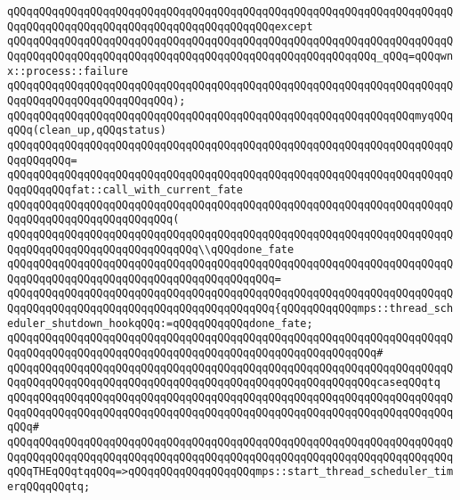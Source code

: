 \verb|qQQqqQQqqQQqqQQqqQQqqQQqqQQqqQQqqQQqqQQqqQQqqQQqqQQqqQQqqQQqqQQqqQQqqQQqqQQqqQQqqQQqqQQqqQQqqQQqqQQqqQQqqQQqqQQqexcept|\newline
\verb|qQQqqQQqqQQqqQQqqQQqqQQqqQQqqQQqqQQqqQQqqQQqqQQqqQQqqQQqqQQqqQQqqQQqqQQqqQQqqQQqqQQqqQQqqQQqqQQqqQQqqQQqqQQqqQQqqQQqqQQqqQQqqQQq_qQQq=qQQqwnx::process::failure|\newline
\verb|qQQqqQQqqQQqqQQqqQQqqQQqqQQqqQQqqQQqqQQqqQQqqQQqqQQqqQQqqQQqqQQqqQQqqQQqqQQqqQQqqQQqqQQqqQQqqQQq);|\newline
\newline
\verb|qQQqqQQqqQQqqQQqqQQqqQQqqQQqqQQqqQQqqQQqqQQqqQQqqQQqqQQqqQQqqQQqmyqQQqqQQq(clean_up,qQQqstatus)|\newline
\verb|qQQqqQQqqQQqqQQqqQQqqQQqqQQqqQQqqQQqqQQqqQQqqQQqqQQqqQQqqQQqqQQqqQQqqQQqqQQqqQQq=|\newline
\verb|qQQqqQQqqQQqqQQqqQQqqQQqqQQqqQQqqQQqqQQqqQQqqQQqqQQqqQQqqQQqqQQqqQQqqQQqqQQqqQQqfat::call_with_current_fate|\newline
\verb|qQQqqQQqqQQqqQQqqQQqqQQqqQQqqQQqqQQqqQQqqQQqqQQqqQQqqQQqqQQqqQQqqQQqqQQqqQQqqQQqqQQqqQQqqQQqqQQq(|\newline
\verb|qQQqqQQqqQQqqQQqqQQqqQQqqQQqqQQqqQQqqQQqqQQqqQQqqQQqqQQqqQQqqQQqqQQqqQQqqQQqqQQqqQQqqQQqqQQqqQQqqQQq\\qQQqdone_fate|\newline
\verb|qQQqqQQqqQQqqQQqqQQqqQQqqQQqqQQqqQQqqQQqqQQqqQQqqQQqqQQqqQQqqQQqqQQqqQQqqQQqqQQqqQQqqQQqqQQqqQQqqQQqqQQqqQQqqQQq=|\newline
\verb|qQQqqQQqqQQqqQQqqQQqqQQqqQQqqQQqqQQqqQQqqQQqqQQqqQQqqQQqqQQqqQQqqQQqqQQqqQQqqQQqqQQqqQQqqQQqqQQqqQQqqQQqqQQqqQQq{qQQqqQQqqQQqmps::thread_scheduler_shutdown_hookqQQq:=qQQqqQQqqQQqdone_fate;|\newline
\verb|qQQqqQQqqQQqqQQqqQQqqQQqqQQqqQQqqQQqqQQqqQQqqQQqqQQqqQQqqQQqqQQqqQQqqQQqqQQqqQQqqQQqqQQqqQQqqQQqqQQqqQQqqQQqqQQqqQQqqQQqqQQqqQQq#|\newline
\verb|qQQqqQQqqQQqqQQqqQQqqQQqqQQqqQQqqQQqqQQqqQQqqQQqqQQqqQQqqQQqqQQqqQQqqQQqqQQqqQQqqQQqqQQqqQQqqQQqqQQqqQQqqQQqqQQqqQQqqQQqqQQqqQQqcaseqQQqtq|\newline
\verb|qQQqqQQqqQQqqQQqqQQqqQQqqQQqqQQqqQQqqQQqqQQqqQQqqQQqqQQqqQQqqQQqqQQqqQQqqQQqqQQqqQQqqQQqqQQqqQQqqQQqqQQqqQQqqQQqqQQqqQQqqQQqqQQqqQQqqQQqqQQqqQQq#|\newline
\verb|qQQqqQQqqQQqqQQqqQQqqQQqqQQqqQQqqQQqqQQqqQQqqQQqqQQqqQQqqQQqqQQqqQQqqQQqqQQqqQQqqQQqqQQqqQQqqQQqqQQqqQQqqQQqqQQqqQQqqQQqqQQqqQQqqQQqqQQqqQQqqQQqTHEqQQqtqqQQq=>qQQqqQQqqQQqqQQqqQQqmps::start_thread_scheduler_timerqQQqqQQqtq;|\newline
